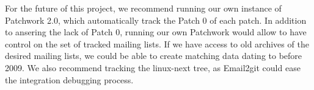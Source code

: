 For the future of this project, we recommend running our own instance of Patchwork 2.0, which automatically track the Patch 0 of each patch. In addition to ansering the lack of Patch 0, running our own Patchwork would allow to have control on the set of tracked mailing lists. If we have access to old archives of the desired mailing lists, we could be able to create matching data dating to before 2009. We also recommend tracking the linux-next tree, as Email2git could ease the integration debugging process. 